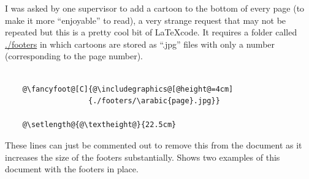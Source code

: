     I was asked by one supervisor to add a cartoon to the bottom of every page (to make it more ``enjoyable'' to read), a very strange request that may not be repeated but this is a pretty cool bit of \LaTeX code. It requires a folder called \url{./footers} in which cartoons are stored as ``.jpg'' files with only a number (corresponding to the page number).

    \begin{lstlisting}[style=base]

    @\fancyfoot@[C]{@\includegraphics@[@height@=4cm]
                   {./footers/\arabic{page}.jpg}}

    @\setlength@{@\textheight@}{22.5cm}

    \end{lstlisting}

    These lines can just be commented out to remove this from the document as it increases the size of the footers substantially.  Shows two examples of this document with the footers in place.

